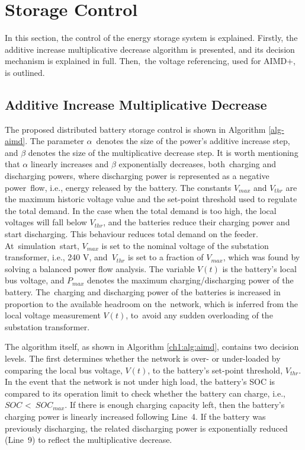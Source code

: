 \section{Storage Control}
\label{ch1:sec:storage-control}

In this section, the control of the energy storage system is explained. Firstly, the additive increase multiplicative decrease algorithm is presented, and its decision mechanism is explained in full. Then,~the voltage referencing, used for AIMD+, is outlined.

\subsection{Additive Increase Multiplicative Decrease}

The proposed distributed battery storage control is shown in Algorithm \ref{alg-aimd}. The parameter $\alpha$~denotes the size of the power's additive increase step, and $\beta$ denotes the size of the multiplicative decrease step. It is worth mentioning that $\alpha$ linearly increases and $\beta$ exponentially decreases, both~charging and discharging powers, where discharging power is represented as a negative power~flow, i.e., energy released by the battery. The constants $V_{max}$ and $V_{thr}$ are the maximum historic voltage value and the set-point threshold used to regulate the total demand. In the case when the total demand is too high, the local voltages will fall below $V_{thr}$, and the batteries reduce their charging power and start discharging. This behaviour reduces total demand on the feeder. At~simulation~start, $V_{max}$ is set to the nominal voltage of the substation transformer, i.e., 240 V, and~$V_{thr}$ is set to a fraction of $V_{max}$, which was found by solving a balanced power flow analysis. The variable $V(t)$ is the battery's local bus voltage, and $P_{max}$ denotes the maximum charging/discharging power of the battery. The~charging and discharging power of the batteries is increased in proportion to the available headroom on the~network, which is inferred from the local voltage measurement $V(t)$, to~avoid any sudden overloading of the substation transformer.




The algorithm itself, as shown in Algorithm \ref{ch1:alg:aimd}, contains two decision levels. The first determines whether the network is over- or under-loaded by comparing the local bus voltage, $V(t)$, to the battery's set-point threshold, $V_{thr}$. In the event that the network is not under high load, the battery's SOC is compared to its operation limit to check whether the battery can charge, i.e., $SOC$ \textless~$SOC_{max}$. If there is enough charging capacity left, then the battery's charging power is linearly increased following Line~4. If the battery was previously discharging, the related discharging power is exponentially reduced (Line~9) to reflect the multiplicative decrease.

